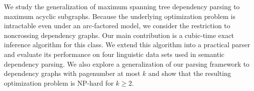 We study the generalization of maximum spanning tree dependency parsing to maximum acyclic subgraphs. Because the underlying optimization problem is intractable even under an arc-factored model, we consider the restriction to noncrossing dependency graphs. Our main contribution is a cubic-time exact inference algorithm for this class. We extend this algorithm into a practical parser and evaluate its performance on four linguistic data sets used in semantic dependency parsing. We also explore a generalization of our parsing framework to dependency graphs with pagenumber at most $k$ and show that the resulting optimization problem is NP-hard for $k \geq 2$.
